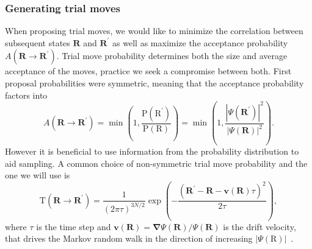 \documentclass[final,3p,times,twocolumn]{elsarticle}
\begin{document}
	\subsubsection{Generating trial moves}
	When proposing trial moves, we would like to minimize the correlation between subsequent states $\mathbf{R}$ and $\mathbf{R}^\prime$ as well as maximize the acceptance probability $A(\mathbf{R} \rightarrow \mathbf{R}^{\prime})$. Trial move probability determines both the size and average acceptance of the moves, practice we seek a compromise between both. First proposal probabilities were symmetric, meaning that the acceptance probability factors into
	\begin{equation}
		A\left(\mathbf{R} \rightarrow \mathbf{R}^{\prime}\right)=\min \left(1, \frac{\mathrm{P}(\mathrm{R}^{\prime})}{\mathrm{P}(\mathrm{R})}\right) = \min\left(1, \frac{|\Psi(\mathbf{R}^\prime)|^2}{|\Psi(\mathbf{R})|^2}\right).
	\end{equation}
	However it is beneficial to use information from the probability distribution to aid sampling. A common choice of non-symmetric trial move probability and the one we will use is 
	\begin{equation}
		\label{eq:trialmove}
		\mathrm{T}\left(\mathbf{R} \rightarrow \mathbf{R}^{\prime}\right) = \frac{1}{(2 \pi \tau)^{3 N / 2}}\exp\left({-} \frac{\left(\mathbf{R}^{\prime}-\mathbf{R}-\mathbf{v}\left(\mathbf{R}\right) \tau\right)^{2}}{2 \tau}\right),
	\end{equation}
	where $\tau$ is the time step and $\mathbf{v}(\mathbf{R})=\boldsymbol{\nabla} \Psi(\mathbf{R}) / \Psi(\mathbf{R})$ is the drift velocity, that drives the Markov random walk in the direction of increasing $|\Psi(\mathrm{R})|$~\cite{gubernatis_kawashima_werner_2016}.
	
\end{document}
